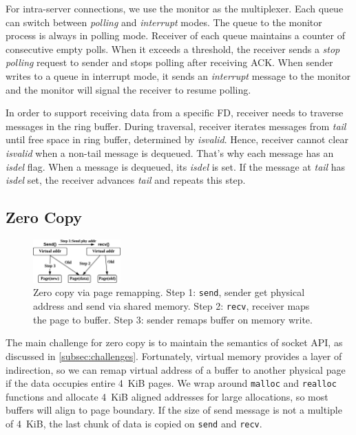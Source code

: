 For intra-server connections, we use the monitor as the multiplexer. Each queue can switch between \textit{polling} and \textit{interrupt} modes. The queue to the monitor process is always in polling mode. Receiver of each queue maintains a counter of consecutive empty polls. When it exceeds a threshold, the receiver sends a \textit{stop polling} request to sender and stops polling after receiving ACK. When sender writes to a queue in interrupt mode, it sends an \textit{interrupt} message to the monitor and the monitor will signal the receiver to resume polling. 

In order to support receiving data from a specific FD, receiver needs to traverse messages in the ring buffer. During traversal, receiver iterates messages from \textit{tail} until free space in ring buffer, determined by \textit{isvalid}. Hence, receiver cannot clear \textit{isvalid} when a non-tail message is dequeued. That's why each message has an \textit{isdel} flag. When a message is dequeued, its \textit{isdel} is set. If the message at \textit{tail} has \textit{isdel} set, the receiver advances \textit{tail} and repeats this step.

\subsection{Zero Copy}
\label{subsec:zerocopy}

\begin{figure}[t]
	\centering
	\includegraphics[width=0.3\textwidth]{images/zerocopy}
	\caption{Zero copy via page remapping. Step 1: \texttt{send}, sender get physical address and send via shared memory. Step 2: \texttt{recv}, receiver maps the page to buffer. Step 3: sender remaps buffer on memory write.}
	\vspace{-15pt}
	\label{fig:zerocopy}
\end{figure}

The main challenge for zero copy is to maintain the semantics of socket API, as discussed in \ref{subsec:challenges}.
Fortunately, virtual memory provides a layer of indirection, so we can remap virtual address of a buffer to another physical page if the data occupies entire 4~KiB pages.
We wrap around \texttt{malloc} and \texttt{realloc} functions and allocate 4~KiB aligned addresses for large allocations, so most buffers will align to page boundary.
If the size of send message is not a multiple of 4~KiB, the last chunk of data is copied on \texttt{send} and \texttt{recv}.

